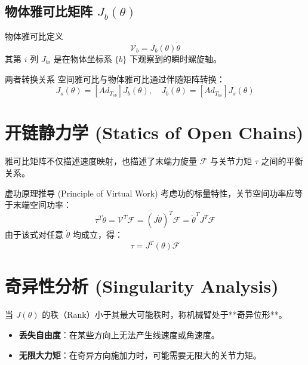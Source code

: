 \subsection{物体雅可比矩阵 $J_b(\theta)$}

\begin{formulabox}{物体雅可比定义}
\begin{equation}
    \mathcal{V}_b = J_b(\theta)\dot{\theta}
\end{equation}
其第 $i$ 列 $J_{bi}$ 是在物体坐标系 $\{b\}$ 下观察到的瞬时螺旋轴。
\end{formulabox}

\begin{mybox}{两者转换关系}
空间雅可比与物体雅可比通过伴随矩阵转换：
\begin{equation}
    J_s(\theta) = [Ad_{T_{sb}}] J_b(\theta), \quad J_b(\theta) = [Ad_{T_{bs}}] J_s(\theta)
\end{equation}
\end{mybox}

\section{开链静力学 (Statics of Open Chains)}

雅可比矩阵不仅描述速度映射，也描述了末端力旋量 $\mathcal{F}$ 与关节力矩 $\tau$ 之间的平衡关系。

\begin{mybox}{虚功原理推导 (Principle of Virtual Work)}
考虑功的标量特性，关节空间功率应等于末端空间功率：
\begin{equation}
    \tau^T \dot{\theta} = \mathcal{V}^T \mathcal{F} = (J\dot{\theta})^T \mathcal{F} = \dot{\theta}^T J^T \mathcal{F}
\end{equation}
由于该式对任意 $\dot{\theta}$ 均成立，得：
\begin{equation}
    \tau = J^T(\theta) \mathcal{F}
\end{equation}
\end{mybox}

\section{奇异性分析 (Singularity Analysis)}

当 $J(\theta)$ 的秩（Rank）小于其最大可能秩时，称机械臂处于**奇异位形**。

\begin{itemize}
    \item \textbf{丢失自由度}：在某些方向上无法产生线速度或角速度。
    \item \textbf{无限大力矩}：在奇异方向施加力时，可能需要无限大的关节力矩。
\end{itemize}

